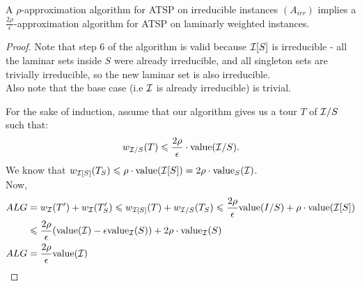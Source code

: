 \documentclass[./main.tex]{subfiles}
\begin{document}
	\begin{theorem}
		A $\rho$-approximation algorithm for ATSP on irreducible instances $(A_{irr})$ implies a $\frac{2\rho}{\epsilon}$-approximation algorithm for ATSP on laminarly weighted instances.
	\end{theorem}
	\begin{proof}
		Note that step 6 of the algorithm is valid because $\mathcal{I}[S]$ is irreducible - all the laminar sets inside $S$ were already irreducible, and all singleton sets are trivially irreducible, so the new laminar set is also irreducible.\\
		Also note that the base case (i.e $\mathcal{I}$ is already irreducible) is trivial.

		For the sake of induction, assume that our algorithm gives us a tour $T$ of $\mathcal{I}/S$ such that:
		\[
			w_{\mathcal{I}/S}(T) \leqslant \frac{2\rho}{\epsilon}\cdot \textup{value}(\mathcal{I}/S).
		\]
		We know that $w_{\mathcal{I}[S]}(T_S)\leqslant \rho\cdot \textup{value}(\mathcal{I}[S]) = 2\rho\cdot\textup{value}_S(\mathcal{I})$.\\
		Now,
		\begin{align*}
				ALG &= w_{\mathcal{I}}(T') + w_{\mathcal{I}}(T_S') \leqslant w_{\mathcal{I}[S]}(T) + w_{\mathcal{I}/S}(T_S) \leqslant \frac{2\rho}{\epsilon}\textup{value}(I/S) + \rho\cdot \textup{value}(\mathcal{I}[S])\\
				&\leqslant \frac{2\rho}{\epsilon}(\textup{value}(\mathcal{I}) - \epsilon \textup{value}_{\mathcal{I}}(S)) + 2\rho\cdot\textup{value}_{\mathcal{I}}(S)\\
				ALG &= \frac{2\rho}{\epsilon} \textup{value}(\mathcal{I})
		\end{align*}
	\end{proof}
\end{document}
